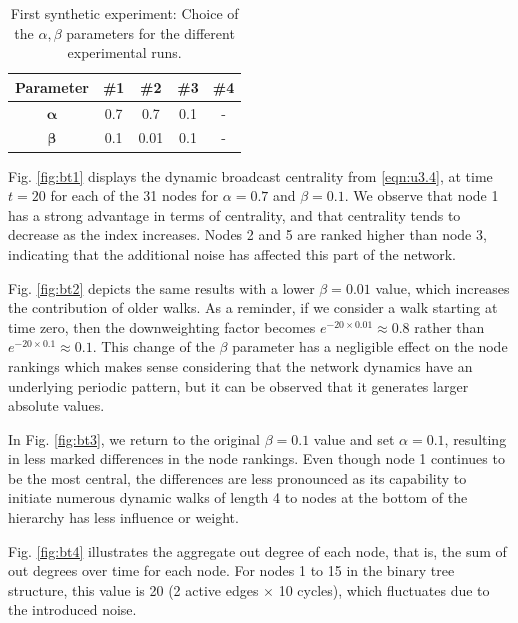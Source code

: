 \begin{table}[ht]
            \bigskip
		\centering %
		\begin{tabular}{c c c c c} %
			\hline\hline %
			\textbf{Parameter} & \textbf{\#1} & \textbf{\#2} & \textbf{\#3} & \textbf{\#4} \\ [0.1ex] %
			\hline\hline 
			$\mathbf{\alpha}$ & 0.7 & 0.7 & 0.1 & -\\ %
			$\mathbf{\beta}$ & 0.1 & 0.01 & 0.1 & - \\ [0.5ex] %
			\hline %
		\end{tabular}
		\caption{First synthetic experiment: Choice of the $\alpha,\beta$ parameters for the different experimental runs.} 
       \label{table:parameters} 
\end{table}

\newpage

Fig. \ref{fig:bt1} displays the dynamic broadcast centrality from \eqref{eqn:u3.4}, at time $t=20$ for each of the 31 nodes for  $\alpha=0.7$ and $\beta=0.1$. We observe that node 1 has a strong advantage in terms of centrality, and that centrality tends to decrease as the index increases. Nodes 2 and 5 are ranked higher than node 3, indicating that the additional noise has affected this part of the network.

Fig. \ref{fig:bt2} depicts the same results with a lower $\beta=0.01$ value, which increases the contribution of older walks. As a reminder, if we consider a walk starting at time zero, then the  downweighting factor becomes $e^{−20 \times 0.01} \approx 0.8$ rather than $e^{−20 \times 0.1} \approx 0.1$. This change of the $\beta$ parameter has a negligible effect on the node rankings which makes sense considering that the network dynamics have an underlying periodic pattern, but it can be observed that it generates larger absolute values.

In Fig. \ref{fig:bt3}, we return to the original $\beta=0.1$ value and set $\alpha=0.1$, resulting in less marked differences in the node rankings. Even though node 1 continues to be the most central, the differences are less pronounced as its capability to initiate numerous dynamic walks of length 4 to nodes at the bottom of the hierarchy has less influence or weight.

Fig. \ref{fig:bt4} illustrates the aggregate out degree of each node, that is, the sum of out degrees over time for each node. For nodes 1 to 15 in the binary tree structure, this value is 20 (2 active edges $\times$ 10 cycles), which fluctuates due to the introduced noise. 

